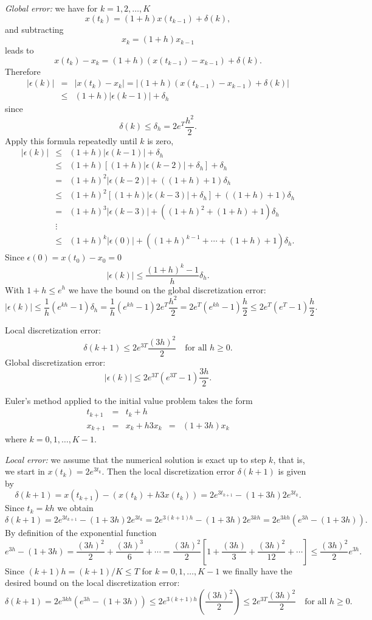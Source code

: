 {\em Global error:} we have for $k=1,2,\ldots,K$
\[
x(t_k)=(1+h)x(t_{k-1})+\delta(k),
\]
and subtracting
\[
x_k = (1+h)x_{k-1}
\]
leads to
\[
x(t_k) - x_k = (1+h)(x(t_{k-1})-x_{k-1})+\delta(k).
\]
Therefore
\begin{eqnarray*}
|\epsilon(k)| & = & |x(t_k) - x_k| =
|(1+h)(x(t_{k-1})-x_{k-1})+\delta(k)|\\
& \le & (1+h)|\epsilon(k-1)|+\delta_h
\end{eqnarray*}
since
\[
\delta(k)\le \delta_h = 2e^{T}\frac{h^2}{2}.
\]
Apply this formula repeatedly until $k$ is zero,
\[
\begin{array}{rcl}
|\epsilon(k)|&\le&(1+h)|\epsilon(k-1)|+\delta_h\\
&\le& (1+h)[(1+h)|\epsilon(k-2)|+\delta_h]+\delta_h\\
&=& (1+h)^2|\epsilon(k-2)| + ((1+h) + 1)\delta_h\\
&\le& (1+h)^2[(1+h)|\epsilon(k-3)|+\delta_h] + ((1+h) + 1)\delta_h\\
&=& (1+h)^3|\epsilon(k-3)| + ((1+h)^2 + (1+h) + 1)\delta_h\\
&\vdots& \\
&\le & (1+h)^k|\epsilon(0)| + ((1+h)^{k-1} +\cdots + (1+h) + 1)\delta_h.
\end{array}
\]
Since $\epsilon(0)=x(t_0) - x_0=0$
\[
|\epsilon(k)| \le \frac{(1+h)^k -1}{h}\delta_h.
\]
With $1+h\le e^{h}$ we have the bound on the global discretization error:
\[
|\epsilon(k)| \le \frac{1}{h} (e^{kh}-1)\delta_h=
\frac{1}{h}(e^{kh}-1)2e^{T}\frac{h^2}{2} =
2e^{T}(e^{kh}-1)\frac{h}{2}
\le 2e^{T}(e^{T}-1)\frac{h}{2}.
\]


 \ans Local discretization error:
\[
\delta(k+1) \le
2e^{3T}\frac{(3h)^2}{2} \quad \mbox{for all $h\ge 0$.}
\]
Global discretization error:
\[
|\epsilon(k)| \le 2e^{3T}(e^{3T}-1)\frac{3h}{2}.
\]

\soln Euler's method applied to the initial value problem takes the form
\[
\begin{array}{rclcl}
t_{k+1} & = & t_k+h & & \\
x_{k+1} & = & x_k + h 3x_k & = & (1+3h)x_k
\end{array}
\]
where $k=0,1,\ldots,K-1$.

{\em Local error:} we assume that the
numerical solution is exact up to step $k$, that is,
we start in $x(t_k)=2e^{3t_k}$.  Then the local discretization error
$\delta(k+1)$ is given by
\[
\delta(k+1) = x(t_{k+1}) - (x(t_k) + h 3 x(t_k))=
2e^{3t_{k+1}} - (1+3h)2e^{3t_k}.
\]
Since $t_k = kh$ we obtain
\[
\delta(k+1) = 2e^{3t_{k+1}} - (1+3h)2e^{3t_k} =
2e^{3(k+1)h} - (1+3h)2e^{3kh} = 2e^{3kh}(e^{3h}-(1+3h)).
\]
By definition of the exponential function
\[
e^{3h}-(1+3h) = \frac{(3h)^2}{2}+\frac{(3h)^3}{6}+\cdots =
\frac{(3h)^2}{2}\left[ 1+\frac{(3h)}{3}+\frac{(3h)^2}{12}+\cdots\right]
\le \frac{(3h)^2}{2}e^{3h}.
\]
Since $(k+1)h=(k+1)/K\le T$ for $k=0,1,\ldots,K-1$ we finally have the
desired bound on the local discretization error:
\[
\delta(k+1) = 2e^{3kh}(e^{3h}-(1+3h)) \le
2e^{3(k+1)h}\left(\frac{(3h)^2}{2}\right)\le
2e^{3T}\frac{(3h)^2}{2} \quad \mbox{for all $h\ge 0$.}
\]

